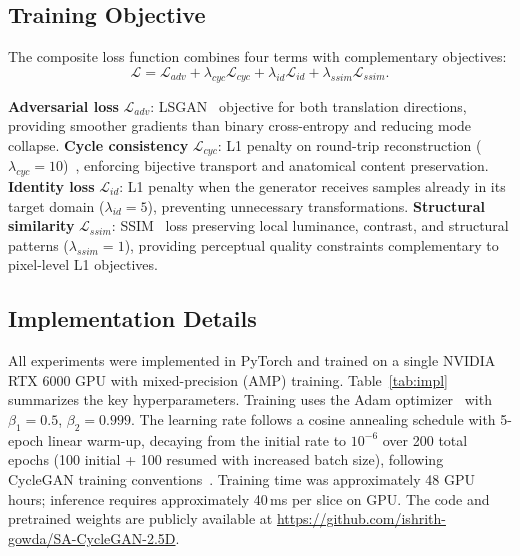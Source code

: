 \documentclass{article}
\begin{document}
\subsection{Training Objective}

The composite loss function combines four terms with complementary objectives:
\begin{equation}
  \mathcal{L} = \mathcal{L}_{adv}
    + \lambda_{cyc}\mathcal{L}_{cyc}
    + \lambda_{id}\mathcal{L}_{id}
    + \lambda_{ssim}\mathcal{L}_{ssim}.
  \label{eq:loss}
\end{equation}

\textbf{Adversarial loss} $\mathcal{L}_{adv}$: LSGAN~\cite{mao2017lsgan} objective for
both translation directions, providing smoother gradients than binary cross-entropy and
reducing mode collapse. \textbf{Cycle consistency} $\mathcal{L}_{cyc}$: L1 penalty on
round-trip reconstruction ($\lambda_{cyc}{=}10$)~\cite{zhu2017cyclegan}, enforcing
bijective transport and anatomical content preservation. \textbf{Identity loss}
$\mathcal{L}_{id}$: L1 penalty when the generator receives samples already in its target
domain ($\lambda_{id}{=}5$), preventing unnecessary transformations. \textbf{Structural
similarity} $\mathcal{L}_{ssim}$: SSIM~\cite{wang2004ssim} loss preserving local
luminance, contrast, and structural patterns ($\lambda_{ssim}{=}1$), providing perceptual
quality constraints complementary to pixel-level L1 objectives.

\subsection{Implementation Details}

All experiments were implemented in PyTorch and trained on a single NVIDIA RTX 6000 GPU
with mixed-precision (AMP) training. Table~\ref{tab:impl} summarizes the key
hyperparameters. Training uses the Adam optimizer~\cite{kingma2015adam} with
$\beta_1{=}0.5$, $\beta_2{=}0.999$. The learning rate follows a cosine annealing
schedule with 5-epoch linear warm-up, decaying from the initial rate to $10^{-6}$ over
200 total epochs (100 initial + 100 resumed with increased batch size), following
CycleGAN training conventions~\cite{zhu2017cyclegan}. Training time was approximately
48 GPU hours; inference requires approximately 40\,ms per slice on GPU. The code and pretrained weights
are publicly available at \url{https://github.com/ishrith-gowda/SA-CycleGAN-2.5D}.
\end{document}
